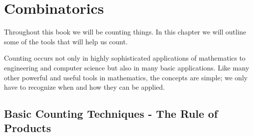 \documentclass[10pt,]{book}
\theoremstyle{plain}
\theoremstyle{definition}
\begin{document}
\chapter[Combinatorics]{Combinatorics}\label{combinatorics}
\typeout{************************************************}
\typeout{************************************************}
Throughout this book we will be counting things. In this chapter we will outline some of the tools that will help us count.%
\par
Counting occurs not only in highly sophisticated applications of mathematics to engineering and computer science but also in many basic applications. Like many other powerful and useful tools in mathematics, the concepts are simple; we only have to recognize when and how they can be applied.
%
\typeout{************************************************}
\typeout{************************************************}
\section[Basic Counting Techniques - The Rule of Products]{Basic Counting Techniques - The Rule of Products}\label{the-rule-of-products}
\typeout{************************************************}
\typeout{************************************************}
\subsection[]{}\label{What-is-Combinatorics}
\end{document}
